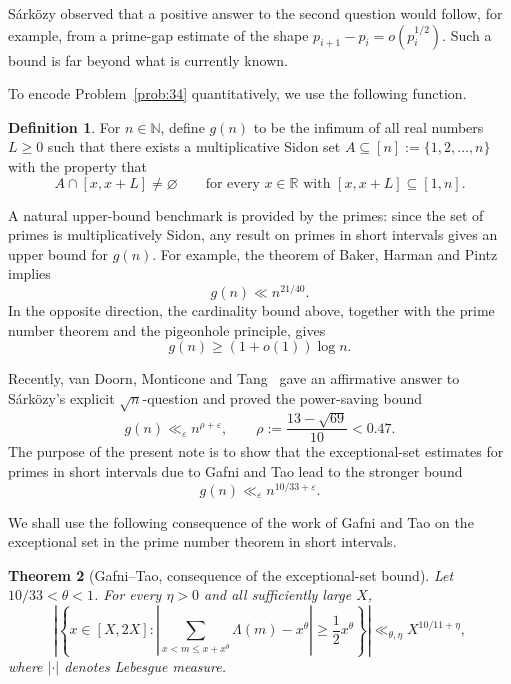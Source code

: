 \documentclass[11pt,reqno]{amsart}
\numberwithin{equation}{section}
\theoremstyle{plain}
\newtheorem{theorem}{Theorem}[section]
\theoremstyle{definition}
\newtheorem{definition}[theorem]{Definition}
\newcommand{\N}{\mathbb N}
\begin{document}
S\'ark\"ozy observed that a positive answer to the second question would follow,
for example, from a prime-gap estimate of the shape
\(p_{i+1}-p_i=o(p_i^{1/2})\).  Such a bound is far beyond what is currently
known.

To encode Problem~\ref{prob:34} quantitatively, we use the following function.

\begin{definition}
For $n\in\N$, define $g(n)$ to be the infimum of all real numbers $L\ge 0$
such that there exists a multiplicative Sidon set
\(A\subseteq[n]:=\{1,2,\dots,n\}\) with the property that
\[
        A\cap[x,x+L]\neq\varnothing
        \qquad\text{for every }x\in\mathbb R
        \text{ with }[x,x+L]\subseteq[1,n].
\]
\end{definition}

A natural upper-bound benchmark is provided by the primes: since the set of
primes is multiplicatively Sidon, any result on primes in short intervals gives
an upper bound for \(g(n)\).  For example, the theorem of Baker, Harman and
Pintz~\cite{BakerHarmanPintz2001} implies
\[
        g(n)\ll n^{21/40}.
\]
In the opposite direction, the cardinality bound above, together with the prime
number theorem and the pigeonhole principle, gives
\[
        g(n)\ge (1+o(1))\log n .
\]

Recently, van Doorn, Monticone and Tang~\cite{DMT2026} gave an affirmative
answer to S\'ark\"ozy's explicit \(\sqrt n\)-question and proved the
power-saving bound
\[
        g(n)\ll_\varepsilon n^{\rho+\varepsilon},
        \qquad
        \rho:=\frac{13-\sqrt{69}}{10}<0.47 .
\]
The purpose of the present note is to show that the exceptional-set estimates
for primes in short intervals due to Gafni and Tao lead to the stronger bound
\[
        g(n)\ll_\varepsilon n^{10/33+\varepsilon}.
\]



We shall use the following consequence of the work of Gafni and Tao on the
exceptional set in the prime number theorem in short intervals.

\begin{theorem}[Gafni--Tao, consequence of the exceptional-set bound]
\label{thm:GT-input}
Let \(10/33<\theta<1\). For every $\eta>0$ and all sufficiently large $X$,
\[
\left|\left\{x\in[X,2X]:
\left|\sum_{x<m\le x+x^\theta}\Lambda(m)-x^\theta\right|
        \ge \frac12 x^\theta\right\}\right|
        \ll_{\theta,\eta} X^{10/11+\eta},
\]
where $|\cdot|$ denotes Lebesgue measure.
\end{theorem}
\end{document}
